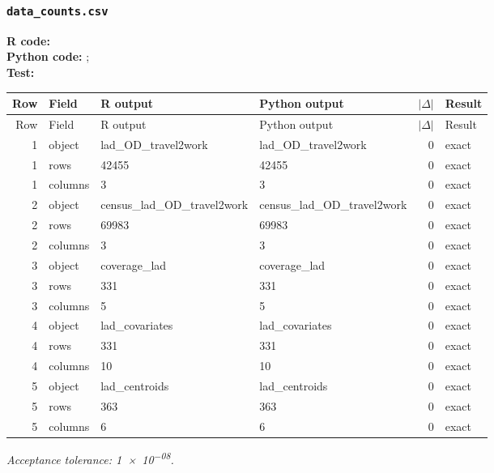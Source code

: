\documentclass[10pt]{article}
\begin{document}
\subsubsection{\texorpdfstring{\texttt{data\_counts.csv}}{data\_counts.csv}}
{\footnotesize \textbf{R code:} \\ \textbf{Python code:} ; \\ \textbf{Test:} \par}

\small
\begin{longtable}{@{}r p{}p{}p{}rl@{}}
\toprule
Row & Field & R output & Python output & $|\Delta|$ & Result \\
\midrule
\endfirsthead
\toprule
Row & Field & R output & Python output & $|\Delta|$ & Result \\
\midrule
\endhead
1 & object & lad\_\allowbreak{}OD\_\allowbreak{}travel2work & lad\_\allowbreak{}OD\_\allowbreak{}travel2work & 0 & exact \\
1 & rows & 42455 & 42455 & 0 & exact \\
1 & columns & 3 & 3 & 0 & exact \\
2 & object & census\_\allowbreak{}lad\_\allowbreak{}OD\_\allowbreak{}travel2work & census\_\allowbreak{}lad\_\allowbreak{}OD\_\allowbreak{}travel2work & 0 & exact \\
2 & rows & 69983 & 69983 & 0 & exact \\
2 & columns & 3 & 3 & 0 & exact \\
3 & object & coverage\_\allowbreak{}lad & coverage\_\allowbreak{}lad & 0 & exact \\
3 & rows & 331 & 331 & 0 & exact \\
3 & columns & 5 & 5 & 0 & exact \\
4 & object & lad\_\allowbreak{}covariates & lad\_\allowbreak{}covariates & 0 & exact \\
4 & rows & 331 & 331 & 0 & exact \\
4 & columns & 10 & 10 & 0 & exact \\
5 & object & lad\_\allowbreak{}centroids & lad\_\allowbreak{}centroids & 0 & exact \\
5 & rows & 363 & 363 & 0 & exact \\
5 & columns & 6 & 6 & 0 & exact \\
\bottomrule
\end{longtable}
\normalsize
\textit{Acceptance tolerance: \num{1e-08}.}
\end{document}
